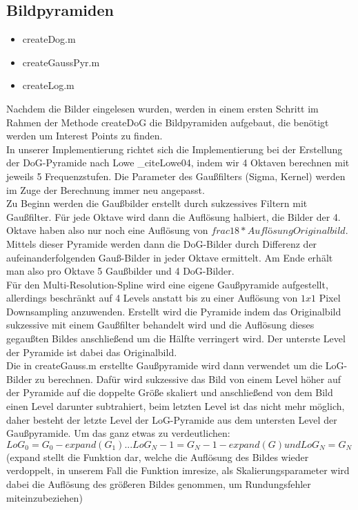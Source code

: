 \documentclass[deutsch]{scrartcl}
\begin{document}
\subsection{Bildpyramiden}
\begin{itemize}
	\item createDog.m 
	\item createGaussPyr.m 
	\item createLog.m
\end{itemize}
Nachdem die Bilder eingelesen wurden, werden in einem ersten Schritt im Rahmen
der Methode createDoG die Bildpyramiden aufgebaut, die benötigt werden um
Interest Points zu finden. \\
In unserer Implementierung richtet sich die Implementierung bei der Erstellung der DoG-Pyramide nach Lowe _cite{Lowe04}, indem wir 4 Oktaven berechnen mit jeweils 5 Frequenzstufen. Die Parameter des Gaußfilters (Sigma, Kernel) werden im Zuge der Berechnung immer neu angepasst.\\
Zu Beginn werden die Gaußbilder erstellt durch sukzessives Filtern mit Gaußfilter. Für jede Oktave wird dann die Auflösung halbiert, die Bilder der 4. Oktave haben also nur noch eine Auflösung von $frac{1}{8} * Auflösung Originalbild$.\\
Mittels dieser Pyramide werden dann die DoG-Bilder durch Differenz der aufeinanderfolgenden Gauß-Bilder in jeder Oktave ermittelt. Am Ende erhält man also pro Oktave 5 Gaußbilder und 4 DoG-Bilder.\\
Für den Multi-Resolution-Spline wird eine eigene Gaußpyramide aufgestellt, allerdings beschränkt auf 4 Levels anstatt bis zu einer Auflösung von $1x1$ Pixel Downsampling anzuwenden. Erstellt wird die Pyramide indem das Originalbild sukzessive mit einem Gaußfilter behandelt wird und die Auflösung dieses gegaußten Bildes anschließend um die Hälfte verringert wird. Der unterste Level der Pyramide ist dabei das Originalbild.\\
Die in createGauss.m erstellte Gaußpyramide wird dann verwendet um die LoG-Bilder zu berechnen. Dafür wird sukzessive das Bild von einem Level höher auf der Pyramide auf die doppelte Größe skaliert und anschließend von dem Bild einen Level darunter subtrahiert, beim letzten Level ist das nicht mehr möglich, daher besteht der letzte Level der LoG-Pyramide aus dem untersten Level der Gaußpyramide. Um das ganz etwas zu verdeutlichen:
$LoG_0 = G_0 - expand(G_1) ... LoG_N-1 = G_N-1 - expand(G) und LoG_N = G_N$\\
(expand stellt die Funktion dar, welche die Auflösung des Bildes wieder verdoppelt, in unserem Fall die Funktion imresize, als Skalierungsparameter wird dabei die Auflösung des größeren Bildes genommen, um Rundungsfehler miteinzubeziehen)
\end{document}
